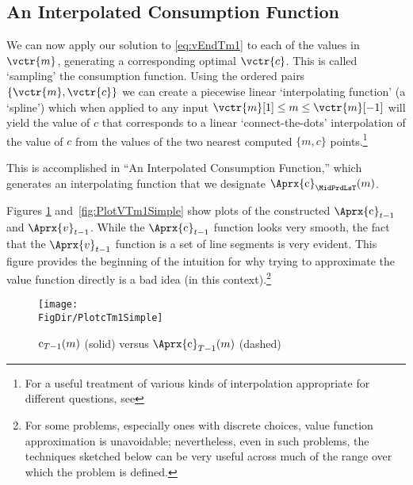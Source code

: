 \documentclass[titlepage, headings=optiontotocandhead]{Resources/texmf-local/tex/latex/econtex}
\begin{document}
\hypertarget{an-interpolated-consumption-function}{}
\subsection{An Interpolated Consumption Function} \label{subsec:LinInterp}

We can now apply our solution to \eqref{eq:vEndTm1} to each of the values in $\vctr{m}$, generating a corresponding optimal $\vctr{c}$.  This is called `sampling' the consumption function.  Using the ordered pairs $\{\vctr{m},\vctr{c}\}$ we can create a piecewise linear `interpolating function' (a `spline') which when applied to any input $\vctr{m}[1] \leq  m\leq \vctr{m}[-1]$ will yield the value of $c$ that corresponds to a linear `connect-the-dots' interpolation of the value of $c$ from the values of the two nearest computed $\{m,c\}$ points.\footnote{For a useful treatment of various kinds of interpolation appropriate for different questions, see } %

This is accomplished in ``An Interpolated Consumption Function,'' which generates an interpolating function that we designate $\Aprx{\cFunc}_{\MidPrdLsT}(m)$. %

Figures \ref{fig:PlotcTm1Simple} and~\ref{fig:PlotVTm1Simple} show
plots of the constructed $\Aprx{\cFunc}_{t-1}$ and $\Aprx{v}_{t-1}$. While the $\Aprx{\cFunc}_{t-1}$ function looks very smooth, the fact that the $\Aprx{v}_{t-1}$ function is a set of line segments is very evident.  This figure provides the beginning of the intuition for why trying to approximate the value function directly is a bad idea (in this context).\footnote{For some problems, especially ones with discrete choices, value function approximation is unavoidable; nevertheless, even in such problems, the techniques sketched below can be very useful across much of the range over which the problem is defined.}

\hypertarget{PlotcTm1Simple}{}
\begin{figure}
  \centerline{\texttt{[image: \\FigDir/PlotcTm1Simple]}}
  \caption{$\mathrm{c}_{T-1}(m)$ (solid) versus $\Aprx{\cFunc}_{T-1}(m)$ (dashed)}
  \label{fig:PlotcTm1Simple}
\end{figure}
\end{document}
